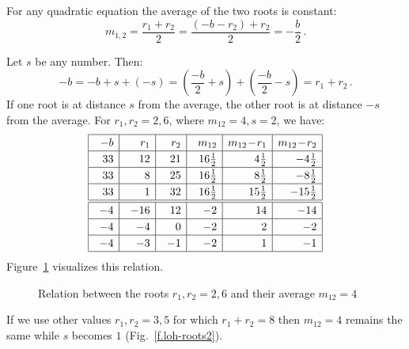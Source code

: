 For any quadratic equation the average of the two roots is constant:
\[
m_{1,2}=\frac{r_1+r_2}{2}=
\frac{(-b-r_2)+r_2}{2}=
-\frac{b}{2}\,.
\]

\newpage

Let $s$ be any number. Then:
\[
-b=-b+s+(-s)=\left(\frac{-b}{2}+s\right) + \left(\frac{-b}{2}-s\right)=r_1+r_2\,.
\]
If one root is at distance $s$ from the average, the other root is at distance $-s$ from  the average. For $r_1,r_2=2,6$, where $m_{12}=4, s=2$, we have:
\[
\renewcommand{\arraystretch}{1.2}
\begin{array}{|@{\hspace{1em}}r|@{\hspace{1em}}r|@{\hspace{1em}}r|@{\hspace{1em}}r|r|r|}
\hline
-b& r_1 & r_2 & m_{12}& m_{12}\!-\!r_1 & m_{12}\!-\!r_2\\\hline
33 & 12 & 21 & 16\frac{1}{2}&4\frac{1}{2} & -4\frac{1}{2}  \\\hline
33 & 8 & 25 & 16\frac{1}{2}&8\frac{1}{2}&-8\frac{1}{2}\\\hline
33 & 1 & 32 & 16\frac{1}{2}&15\frac{1}{2}&-15\frac{1}{2}\\\hline
\hline
-4 & -16 & 12 & -2 &14& -14\\\hline
-4 & -4 & 0 & -2&2&-2 \\\hline
-4 & -3 & -1 & -2&1&-1 \\\hline
\end{array}
\]
Figure~\ref{f.loh-roots1} visualizes this relation.
\begin{figure}[t]
\begin{center}
\end{center}
\caption{Relation between the roots $r_1,r_2=2,6$ and their average $m_{12}=4$}
\label{f.loh-roots1}
\end{figure}
If we use other values $r_1,r_2=3,5$ for which $r_1+r_2=8$ then $m_{12}=4$ remains the same while $s$ becomes $1$ (Fig.~\ref{f.loh-roots2}).

